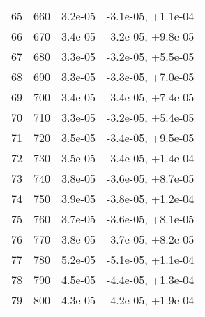 \begin{table}
\begin{adjustbox}{width=1\textwidth/2}
\begin{tabular}{|c|c|c|c|}
\cline{1-4}
65 & 660 & 3.2e-05 & -3.1e-05, +1.1e-04 \\
\cline{1-4}
66 & 670 & 3.4e-05 & -3.2e-05, +9.8e-05 \\
\cline{1-4}
67 & 680 & 3.3e-05 & -3.2e-05, +5.5e-05 \\
\cline{1-4}
68 & 690 & 3.3e-05 & -3.3e-05, +7.0e-05 \\
\cline{1-4}
69 & 700 & 3.4e-05 & -3.4e-05, +7.4e-05 \\
\cline{1-4}
70 & 710 & 3.3e-05 & -3.2e-05, +5.4e-05 \\
\cline{1-4}
71 & 720 & 3.5e-05 & -3.4e-05, +9.5e-05 \\
\cline{1-4}
72 & 730 & 3.5e-05 & -3.4e-05, +1.4e-04 \\
\cline{1-4}
73 & 740 & 3.8e-05 & -3.6e-05, +8.7e-05 \\
\cline{1-4}
74 & 750 & 3.9e-05 & -3.8e-05, +1.2e-04 \\
\cline{1-4}
75 & 760 & 3.7e-05 & -3.6e-05, +8.1e-05 \\
\cline{1-4}
76 & 770 & 3.8e-05 & -3.7e-05, +8.2e-05 \\
\cline{1-4}
77 & 780 & 5.2e-05 & -5.1e-05, +1.1e-04 \\
\cline{1-4}
78 & 790 & 4.5e-05 & -4.4e-05, +1.3e-04 \\
\cline{1-4}
79 & 800 & 4.3e-05 & -4.2e-05, +1.9e-04 \\
\cline{1-4}
\end{tabular}
\end{adjustbox}
\end{table}

